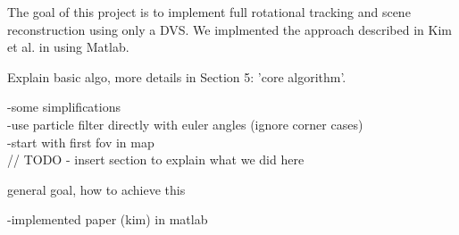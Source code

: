 The goal of this project is to implement full rotational tracking and scene
reconstruction using only a DVS. We implmented the approach described in Kim et
al. in \cite{kim2014simultaneous} using Matlab.

Explain basic algo, more details in Section 5: 'core algorithm'.


-some simplifications\\
    -use particle filter directly with euler angles (ignore corner cases)\\
    -start with first fov in map\\





// TODO - insert section to explain what we did here

general goal, how to achieve this

-implemented paper (kim) in matlab\\

